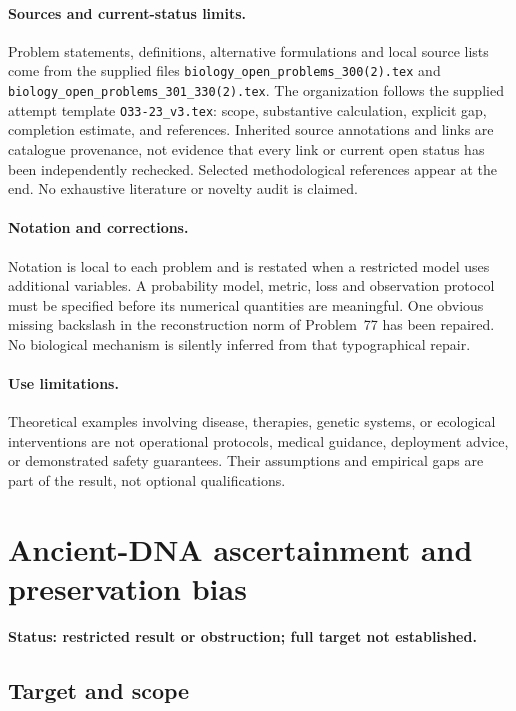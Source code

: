 \documentclass[11pt]{article}
\begin{document}
\paragraph{Sources and current-status limits.}
Problem statements, definitions, alternative formulations and local source lists
come from the supplied files
\texttt{biology\_open\_problems\_300(2).tex} and
\texttt{biology\_open\_problems\_301\_330(2).tex}.
The organization follows the supplied attempt template
\texttt{O33-23\_v3.tex}: scope, substantive calculation, explicit gap,
completion estimate, and references. Inherited source annotations and links are
catalogue provenance, not evidence that every link or current open status has
been independently rechecked. Selected methodological references appear at the
end. No exhaustive literature or novelty audit is claimed.

\paragraph{Notation and corrections.}
Notation is local to each problem and is restated when a restricted model uses
additional variables. A probability model, metric, loss and observation protocol
must be specified before its numerical quantities are meaningful. One obvious
missing backslash in the reconstruction norm of Problem~77 has been repaired.
No biological mechanism is silently inferred from that typographical repair.

\paragraph{Use limitations.}
Theoretical examples involving disease, therapies, genetic systems, or ecological
interventions are not operational protocols, medical guidance, deployment advice,
or demonstrated safety guarantees. Their assumptions and empirical gaps are part
of the result, not optional qualifications.


\section*{Ancient-DNA ascertainment and preservation bias}
\label{prob:178}
\noindent\textbf{Status: restricted result or obstruction; full target not established.}
\subsection{Target and scope}
\end{document}
